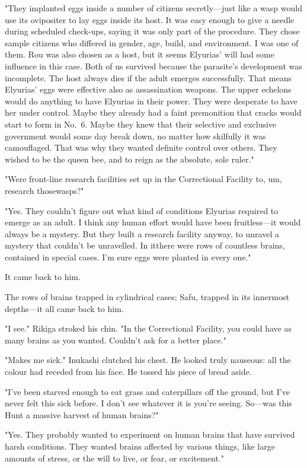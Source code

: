 "They implanted eggs inside a number of citizens secretly---just like a
wasp would use its ovipositer to lay eggs inside its host. It was easy
enough to give a needle during scheduled check-ups, saying it was only
part of the procedure. They chose sample citizens who differed in
gender, age, build, and environment. I was one of them. Rou was also
chosen as a host, but it seems Elyurias' will had some influence in this
case. Both of us survived because the parasite's development was
incomplete. The host always dies if the adult emerges successfully. That
means Elyurias' eggs were effective also as assassination weapons. The
upper echelons would do anything to have Elyurias in their power. They
were desperate to have her under control. Maybe they already had a faint
premonition that cracks would start to form in No.~6. Maybe they knew
that their selective and exclusive government would some day break down,
no matter how skilfully it was camouflaged. That was why they wanted
definite control over others. They wished to be the queen bee, and to
reign as the absolute, sole ruler."

"Were front-line research facilities set up in the Correctional Facility
to, um, research those\el wasps?"

"Yes. They couldn't figure out what kind of conditions Elyurias required
to emerge as an adult. I think any human effort would have been
fruitless---it would always be a mystery. But they built a research
facility anyway, to unravel a mystery that couldn't be unravelled. In
it\el there were rows of countless brains, contained in special cases.
I'm sure eggs were planted in every one."

It came back to him.

The rows of brains trapped in cylindrical cases; Safu, trapped in its
innermost depths---it all came back to him.

"I see." Rikiga stroked his chin. "In the Correctional Facility, you
could have as many brains as you wanted. Couldn't ask for a better
place."

"Makes me sick." Inukashi clutched his chest. He looked truly nauseous:
all the colour had receded from his face. He tossed his piece of bread
aside.

"I've been starved enough to eat grass and caterpillars off the ground,
but I've never felt this sick before. I don't see whatever it is you're
seeing. So---was this Hunt a massive harvest of human brains?"

"Yes. They probably wanted to experiment on human brains that have
survived harsh conditions. They wanted brains affected by various
things, like large amounts of stress, or the will to live, or fear, or
excitement."

